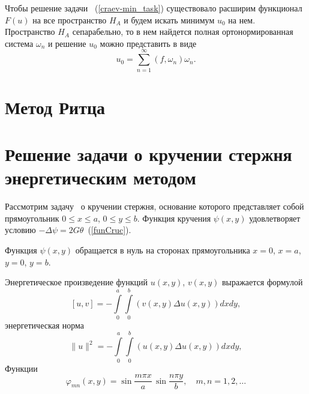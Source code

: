 \documentclass[12pt, a4paper]{article}
\begin{document}
Чтобы решение задачи ~(\ref{craev-min_task}) существовало расширим функционал $F(u)$ на все пространство $H_A$ и будем искать минимум $u_0$ на нем.
Пространство $H_A$ сепарабельно, то в нем найдется полная ортонормированная система $\omega_n$ и решение $u_0$ можно представить в виде
\[
	u_0 = \sum\limits_{n = 1}^{\infty} (f, \omega_n)\omega_n.
\]

\section{Метод Ритца}

\section{Решение задачи о кручении стержня энергетическим методом}
Рассмотрим задачу~\cite{Michilin} о кручении стержня, основание которого представляет собой   прямоугольник
$0 \leqslant x \leqslant a$, $0 \leqslant y \leqslant b$.
Функция кручения $\psi(x, y)$ удовлетворяет условию $-\Delta \psi = 2 G \theta$~(\ref{funCruc}).

Функция $\psi(x, y)$ обращается в нуль на
сторонах прямоугольника $x= 0$, $x = a$, $y = 0$, $y = b$.

Энергетическое произведение функций $u(x, y)$, $v(x, y)$ выражается формулой
\begin{equation}  
	\label{multUV}
	[\textit{u}, \textit{v}] = - \int\limits_0^a \int\limits_0^b \left(v(x, y) \Delta u(x, y ) \right) dx dy,
\end{equation}
энергетическая норма
\begin{equation}  
	\label{energoNorm}
	\|u\|^2 = - \int\limits_0^a \int\limits_0^b \left(u(x, y) \Delta u(x, y ) \right) dx dy,
\end{equation}
Функции
\begin{equation}  
	\label{phi_mn}
	\varphi_{mn}(x, y) = \sin\frac{m\pi x}{a} \, \sin\frac{n\pi y}{b}, \quad
	m, n = 1, 2, \ldots
\end{equation}
\end{document}
